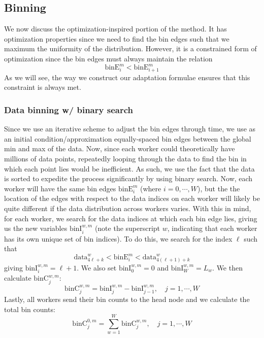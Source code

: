 \documentclass{article}
\begin{document}
\subsection{Binning}
We now discuss the optimization-inspired portion of the method. It has optimization properties since we need to find the bin edges such that we maximum the uniformity of the distribution. However, it is a constrained form of optimization since the bin edges must always maintain the relation
\begin{equation}
	\textrm{binE}^m_i < \textrm{binE}^m_{i+1}
\end{equation}
As we will see, the way we construct our adaptation formulae ensures that this constraint is always met.

\subsubsection{Data binning w/ binary search}
Since we use an iterative scheme to adjust the bin edges through time, we use as an initial condition/approximation equally-spaced bin edges between the global min and max of the data. Now, since each worker could theoretically have millions of data points, repeatedly looping through the data to find the bin in which each point lies would be inefficient. As such, we use the fact that the data is sorted to expedite the process significantly by using binary search. Now, each worker will have the same bin edges $\textrm{binE}^m_i$ (where $i = 0, \cdots, W$), but the the location of the edges with respect to the data indices on each worker will likely be quite different if the data distribution across workers varies. With this in mind, for each worker, we search for the data indices at which each bin edge lies, giving us the new variables $\textrm{binI}^{w,m}_i$ (note the superscript $w$, indicating that each worker has its own unique set of bin indices). To do this, we search for the index $\ell$ such that
\begin{equation}
	\textrm{data}^w_{4\ell+k} < \textrm{binE}^m_i < \textrm{data}^w_{{4(\ell+1)+k}}
\end{equation}
giving $\textrm{binI}^{w,m}_i = \ell+1$. We also set $\textrm{binI}^{w,m}_0 = 0$ and $\textrm{binI}^{w,m}_W = L_w$. We then calculate $\textrm{binC}^{w,m}_j$:
\begin{equation}
	\textrm{binC}^{w,m}_j = \textrm{binI}^{w,m}_j - \textrm{binI}^{w,m}_{j-1}, \quad j = 1, \cdots, W
\end{equation}
Lastly, all workers send their bin counts to the head node and we calculate the total bin counts:
\begin{equation}
	\textrm{binC}^{0,m}_j = \sum_{w=1}^{W} \textrm{binC}^{w,m}_j, \quad j = 1, \cdots, W
\end{equation}
\end{document}
